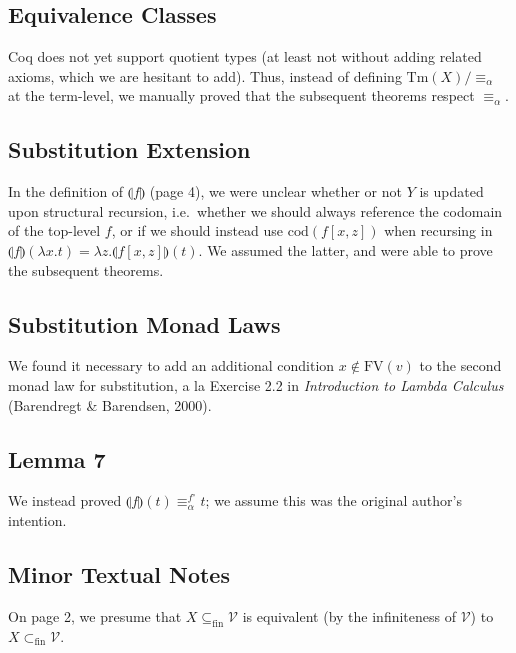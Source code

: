 \documentclass{article}
\begin{document}
\subsection{Equivalence Classes}

Coq does not yet support quotient types (at least not without adding related axioms, which we are
hesitant to add). Thus, instead of defining $\textrm{Tm}(X)/\equiv_\alpha$ at the term-level, we
manually proved that the subsequent theorems respect $\equiv_\alpha$.

\subsection{Substitution Extension}

In the definition of $\llparenthesis f \rrparenthesis$ (page 4), we were unclear whether or not $Y$
is updated upon structural recursion, i.e.\ whether we should always reference the codomain of the
top-level $f$, or if we should instead use $\textrm{cod}(f[x,z])$ when recursing in $\llparenthesis
f \rrparenthesis(\lambda x. t) = \lambda z. \llparenthesis f[x,z] \rrparenthesis (t)$. We assumed
the latter, and were able to prove the subsequent theorems.

\subsection{Substitution Monad Laws}

We found it necessary to add an additional condition $x \notin \textrm{FV}(v)$ to the second monad
law for substitution, a la Exercise 2.2 in \emph{Introduction to Lambda Calculus} (Barendregt \&
Barendsen, 2000).

\subsection{Lemma 7}

We instead proved $\llparenthesis f \rrparenthesis (t) \equiv_\alpha^{f^\circ} t$; we assume this
was the original author's intention.

\subsection{Minor Textual Notes}

On page 2, we presume that $X \subseteq_{\textrm{fin}} \mathcal{V}$ is equivalent (by the
infiniteness of $\mathcal{V}$) to $X \subset_{\textrm{fin}} \mathcal{V}$.
\end{document}
